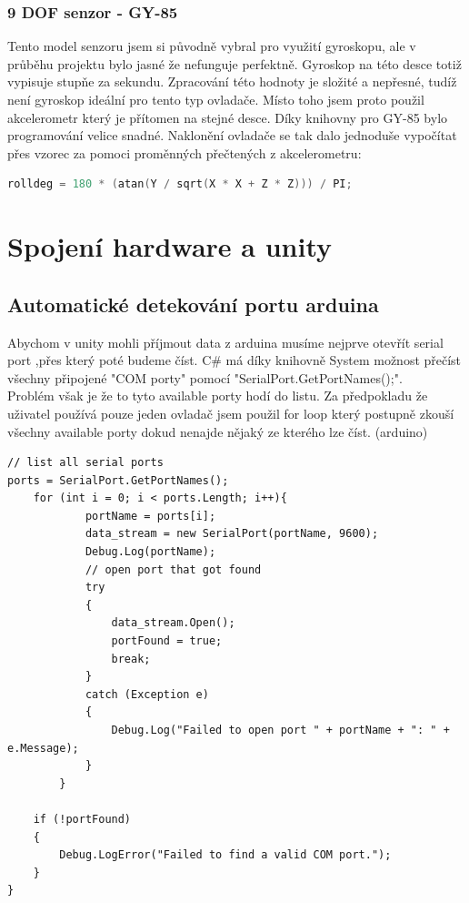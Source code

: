 \documentclass[12pt, a4paper,
twoside        %
]{report}
\let\oldchapter\chapter
\renewcommand{\chapter}{
\clearpage
\pagestyle{plain}
\oldchapter
}
\begin{document}
\subsection{9 DOF senzor - GY-85}
Tento model senzoru jsem si původně vybral pro využití gyroskopu, ale v průběhu projektu bylo jasné že nefunguje perfektně. Gyroskop na této desce totiž vypisuje stupňe za sekundu. Zpracování této hodnoty je složité a nepřesné, tudíž není gyroskop ideální pro tento typ ovladače. Místo toho jsem proto použil akcelerometr který je přítomen na stejné desce. Díky knihovny pro GY-85 bylo programování velice snadné. Naklonění ovladače se tak dalo jednoduše vypočítat přes vzorec za pomoci proměnných přečtených z akcelerometru:
\begin{lstlisting}[language={C++}, caption={C++ - Arduino kód pro vypočítání naklonění }, label={Script}]
rolldeg = 180 * (atan(Y / sqrt(X * X + Z * Z))) / PI;
\end{lstlisting}

\chapter{Spojení hardware a unity}
\section{Automatické detekování portu arduina}
Abychom v unity mohli příjmout data z arduina musíme nejprve otevřít serial port ,přes který poté budeme číst. C\# má díky knihovně System možnost přečíst všechny připojené "COM porty" pomocí "SerialPort.GetPortNames();". \\ 
Problém však je že to tyto available porty hodí do listu. Za předpokladu že uživatel používá pouze jeden ovladač jsem použil for loop který postupně zkouší všechny available porty dokud nenajde nějaký ze kterého lze číst. (arduino)

\begin{lstlisting}[language={[Sharp]C}, caption={C\# skript pro automatické nalezení komunikačního portu arduina}, label={Script}]
// list all serial ports
ports = SerialPort.GetPortNames();
    for (int i = 0; i < ports.Length; i++){
            portName = ports[i];
            data_stream = new SerialPort(portName, 9600);
            Debug.Log(portName);
            // open port that got found
            try
            {
                data_stream.Open();
                portFound = true;
                break;
            }
            catch (Exception e)
            {
                Debug.Log("Failed to open port " + portName + ": " + e.Message);
            }
        }

    if (!portFound)
    {
        Debug.LogError("Failed to find a valid COM port.");
    }
}
\end{lstlisting}
\end{document}
